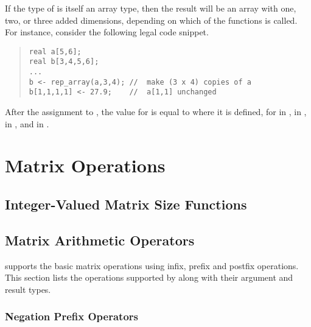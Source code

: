If the type  of  is itself an array type, then the
result will be an array with one, two, or three added dimensions,
depending on which of the  functions is called.  For
instance, consider the following legal code snippet.
%
\begin{quote}
\begin{Verbatim}
real a[5,6];
real b[3,4,5,6];
...
b <- rep_array(a,3,4); //  make (3 x 4) copies of a
b[1,1,1,1] <- 27.9;    //  a[1,1] unchanged
\end{Verbatim}
\end{quote}
%
After the assignment to , the value for  is
equal to  where it is defined, for  in ,
 in ,  in , and  in
.


\chapter{Matrix Operations}\label{matrix-operations.chapter}
\noindent

\section{Integer-Valued Matrix Size Functions}
%
\begin{description}
%
%
%
%
%
%
\end{description}




\section{Matrix Arithmetic Operators}

\Stan supports the basic matrix operations using infix, prefix and
postfix operations.  This section lists the operations supported by
\Stan along with their argument and result types.

\subsection{Negation Prefix Operators}


